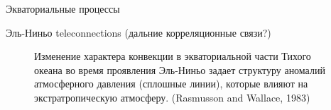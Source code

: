 \begin{chapter}{Экваториальные процессы}
\begin{section}{Эль-Ниньо teleconnections (дальние корреляционные связи?)}
\begin{figure}[h!]
\caption{Изменение характера конвекции в экваториальной части
Тихого океана во время проявления Эль-Ниньо задает структуру аномалий 
атмосферного давления (сплошные линии), 
которые влияют на экстратропическую атмосферу. 
(Rasmusson and Wallace, 1983)}
\label{fig:pressureanomaly}
\end{figure}
%


\end{section}
\end{chapter}
